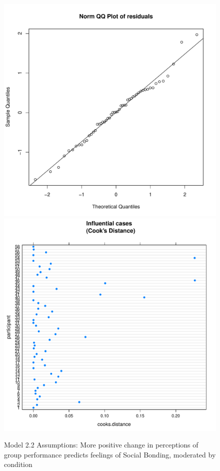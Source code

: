 \begin{figure}[htbp]
    \includegraphics[scale =.4]{images/TEM22QQNorm.pdf}
    \includegraphics[scale =.4]{images/TEM22CooksD.pdf}
    \caption{Model 2.2 Assumptions: More positive change in perceptions of group performance predicts feelings of Social Bonding, moderated by condition}
    \label{fig:M22Assumptions}
\end{figure}

